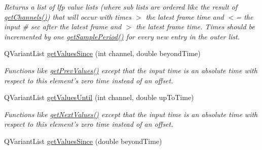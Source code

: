 \begin{DoxyCompactItemize}
\begin{DoxyCompactList}\small\item\em Returns a list of lfp value lists (where sub lists are ordered like the result of \hyperlink{class_picto_1_1_analysis_lfp_data_ad3060e0658f2d7ca36e55fba037cd0ed}{get\-Channels()}) that will occur with times $>$ the latest frame time and $<$= the input \# sec after the latest frame and $>$ the latest frame time. Times should be incremented by one \hyperlink{class_picto_1_1_analysis_lfp_data_a4c96e05c4e349b6a0d3be781bdeee401}{get\-Sample\-Period()} for every new entry in the outer list. \end{DoxyCompactList}\item 
\hypertarget{class_picto_1_1_analysis_lfp_data_ad51ccf2ac9698355184195cb5419003c}{Q\-Variant\-List \hyperlink{class_picto_1_1_analysis_lfp_data_ad51ccf2ac9698355184195cb5419003c}{get\-Values\-Since} (int channel, double beyond\-Time)}\label{class_picto_1_1_analysis_lfp_data_ad51ccf2ac9698355184195cb5419003c}

\begin{DoxyCompactList}\small\item\em Functions like \hyperlink{class_picto_1_1_analysis_lfp_data_abc3fdc4e54b48f6254793ec88c696665}{get\-Prev\-Values()} except that the input time is an absolute time with respect to this element's zero time instead of an offset. \end{DoxyCompactList}\item 
\hypertarget{class_picto_1_1_analysis_lfp_data_a5bfcc3a704d1e31485ac85f8a13861bf}{Q\-Variant\-List \hyperlink{class_picto_1_1_analysis_lfp_data_a5bfcc3a704d1e31485ac85f8a13861bf}{get\-Values\-Until} (int channel, double up\-To\-Time)}\label{class_picto_1_1_analysis_lfp_data_a5bfcc3a704d1e31485ac85f8a13861bf}

\begin{DoxyCompactList}\small\item\em Functions like \hyperlink{class_picto_1_1_analysis_lfp_data_a399178b9bad5e6e9635c67e708ed6ed7}{get\-Next\-Values()} except that the input time is an absolute time with respect to this element's zero time instead of an offset. \end{DoxyCompactList}\item 
\hypertarget{class_picto_1_1_analysis_lfp_data_a30dd59b2bfdd0c1c4970d87bf9f4499a}{Q\-Variant\-List \hyperlink{class_picto_1_1_analysis_lfp_data_a30dd59b2bfdd0c1c4970d87bf9f4499a}{get\-Values\-Since} (double beyond\-Time)}\label{class_picto_1_1_analysis_lfp_data_a30dd59b2bfdd0c1c4970d87bf9f4499a}


\end{DoxyCompactItemize}
